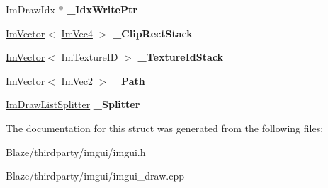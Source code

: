 \begin{DoxyCompactItemize}
\mbox{\label{structImDrawList_a771f4c7f71873852fe030c3e498e5843}} 
Im\+Draw\+Idx $\ast$ {\bfseries \+\_\+\+Idx\+Write\+Ptr}
\item 
\mbox{\label{structImDrawList_ae950024f053f3c94dc2c763d20be609d}} 
\hyperlink{structImVector}{Im\+Vector}$<$ \hyperlink{structImVec4}{Im\+Vec4} $>$ {\bfseries \+\_\+\+Clip\+Rect\+Stack}
\item 
\mbox{\label{structImDrawList_a848faddd121da050214b8d8159e5e704}} 
\hyperlink{structImVector}{Im\+Vector}$<$ Im\+Texture\+ID $>$ {\bfseries \+\_\+\+Texture\+Id\+Stack}
\item 
\mbox{\label{structImDrawList_a5bdc39abf351360500048628b8dc1b07}} 
\hyperlink{structImVector}{Im\+Vector}$<$ \hyperlink{structImVec2}{Im\+Vec2} $>$ {\bfseries \+\_\+\+Path}
\item 
\mbox{\label{structImDrawList_a2893207705100e8a5da8122da56bd162}} 
\hyperlink{structImDrawListSplitter}{Im\+Draw\+List\+Splitter} {\bfseries \+\_\+\+Splitter}
\end{DoxyCompactItemize}


The documentation for this struct was generated from the following files\+:\begin{DoxyCompactItemize}
\item 
Blaze/thirdparty/imgui/imgui.\+h\item 
Blaze/thirdparty/imgui/imgui\+\_\+draw.\+cpp\end{DoxyCompactItemize}
